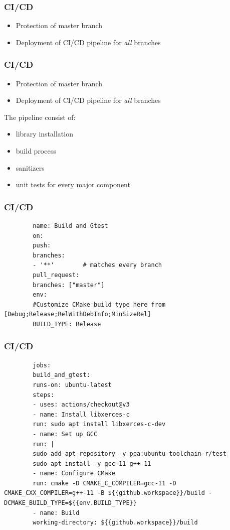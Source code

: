 \begin{frame}
	\frametitle{CI/CD}
	\large
	\begin{itemize}
		\item<1-> Protection of master branch
		\item<2-> Deployment of CI/CD pipeline for \textit{all} branches 
	\end{itemize}
	
\end{frame}


\begin{frame}
	\frametitle{CI/CD}
	\large
	\begin{itemize}
		\item Protection of master branch
		\item Deployment of CI/CD pipeline for \textit{all} branches 
	\end{itemize}
	\Large
	The pipeline consist of:
	\large
	\begin{itemize}
		\item<1-> library installation
		\item<2-> build process
		\item<3-> sanitizers
		\item<4-> unit tests for every major component
	\end{itemize}
\end{frame}

\begin{frame}[fragile]
	\frametitle{CI/CD}
	\begin{lstlisting}
		name: Build and Gtest
		on:
		push:
		branches:
		- '**'        # matches every branch
		pull_request:
		branches: ["master"]
		env:
		#Customize CMake build type here from [Debug;Release;RelWithDebInfo;MinSizeRel]
		BUILD_TYPE: Release	
	\end{lstlisting}
\end{frame}

\begin{frame}[fragile]
	\frametitle{CI/CD}
	
	\begin{lstlisting}
		jobs:
		build_and_gtest:
		runs-on: ubuntu-latest
		steps:
		- uses: actions/checkout@v3
		- name: Install libxerces-c
		run: sudo apt install libxerces-c-dev
		- name: Set up GCC
		run: |
		sudo add-apt-repository -y ppa:ubuntu-toolchain-r/test
		sudo apt install -y gcc-11 g++-11
		- name: Configure CMake
		run: cmake -D CMAKE_C_COMPILER=gcc-11 -D CMAKE_CXX_COMPILER=g++-11 -B ${{github.workspace}}/build -DCMAKE_BUILD_TYPE=${{env.BUILD_TYPE}}
		- name: Build
		working-directory: ${{github.workspace}}/build
	\end{lstlisting}
\end{frame}

